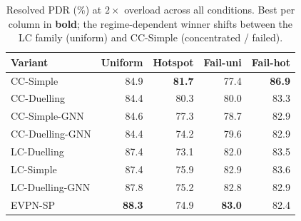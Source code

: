 \begin{table}[t]
  \centering
  \caption{Resolved PDR (\%) at $2\times$ overload across all conditions. Best
  per column in \textbf{bold}; the regime-dependent winner shifts between the LC
  family (uniform) and CC-Simple (concentrated / failed).}
  \label{tab:master}
  \small
  \begin{tabular}{lrrrr}
    \toprule
    Variant & Uniform & Hotspot & Fail-uni & Fail-hot \\
    \midrule
    CC-Simple        & 84.9 & \textbf{81.7} & 77.4 & \textbf{86.9} \\
    CC-Duelling      & 84.4 & 80.3 & 80.0 & 83.3 \\
    CC-Simple-GNN    & 84.6 & 77.3 & 78.7 & 82.9 \\
    CC-Duelling-GNN  & 84.4 & 74.2 & 79.6 & 82.9 \\
    LC-Duelling      & 87.4 & 73.1 & 82.0 & 83.5 \\
    LC-Simple        & 87.4 & 75.9 & 82.9 & 83.6 \\
    LC-Duelling-GNN  & 87.8 & 75.2 & 82.8 & 82.9 \\
    EVPN-SP          & \textbf{88.3} & 74.9 & \textbf{83.0} & 82.4 \\
    \bottomrule
  \end{tabular}
\end{table}
